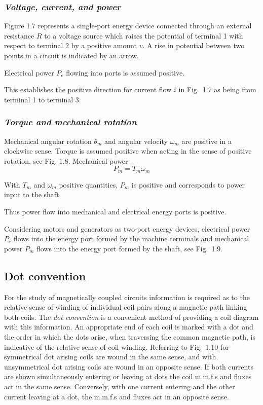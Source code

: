 \documentclass[a4paper,numbers=noenddot,12pt]{scrbook}
\begin{document}
        \subsubsection{\textit{Voltage, current, and power}} Figure 1.7 represents a single-port energy device connected through an external resistance $R$ to a voltage source which raises the potential of terminal 1 with respect to terminal 2 by a positive amount $v$. A rise in potential between two points in a circuit is indicated by an arrow.

        Electrical power $P_e$ flowing into ports is assumed positive.

        This establishes the positive direction for current flow $i$ in Fig.\ 1.7 as being from terminal 1 to terminal 3.

        \subsubsection{\textit{Torque and mechanical rotation}} Mechanical angular rotation $\theta_m$ and angular velocity $\omega_m$ are positive in a clockwise sense. Torque is assumed positive when acting in the sense of positive rotation, see Fig. 1.8.
        Mechanical power
        \begin{equation*}
            P_m = T_m \omega_m
        \end{equation*}

        With $T_m$ and $\omega_m$ positive quantities, $P_m$ is positive and corresponds to power input to the shaft.

        Thus power flow into mechanical and electrical energy ports is positive.

        Considering motors and generators as two-port energy devices, electrical power $P_e$ flows into the energy port formed by the machine terminals and mechanical power $P_m$ flows into the energy port formed by the shaft, see Fig.\ 1.9.

        \subsection{Dot convention}
        For the study of magnetically coupled circuits information is required as to the relative sense of winding of individual coil pairs along a magnetic path linking both coils. The \textit{dot convention} is a convenient method of providing a coil diagram with this information. An appropriate end of each coil is marked with a dot and the order in which the dots arise, when traversing the common magnetic path, is indicative of the relative sense of coil winding. Referring to Fig.\ 1.10 for symmetrical dot arising
        coils are wound in the same sense, and with unsymmetrical dot arising
        coils are wound in an opposite sense. If both currents are shown simultaneously entering or leaving at dots the coil m.m.f.s and fluxes act in the same sense. Conversely, with one current entering and the other current leaving at a dot, the m.m.f.s and fluxes act in an opposite sense.
\end{document}
